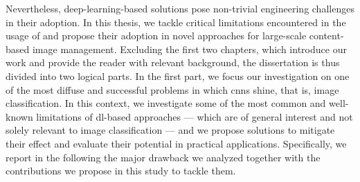 Nevertheless, deep-learning-based solutions pose non-trivial engineering challenges in their adoption.
In this thesis, we tackle critical limitations encountered in the usage of  and propose their adoption in novel approaches for large-scale content-based image management.
Excluding the first two chapters, which introduce our work and provide the reader with relevant background, the dissertation is thus divided into two logical parts.
In the first part, we focus our investigation on one of the most diffuse and successful problems in which \glspl{cnn} shine, that is, image classification.
In this context, we investigate some of the most common and well-known limitations of \gls{dl}-based approaches --- which are of general interest and not solely relevant to image classification --- and we propose solutions to mitigate their effect and evaluate their potential in practical applications.
Specifically, we report in the following the major drawback we analyzed together with the contributions we propose in this study to tackle them.

